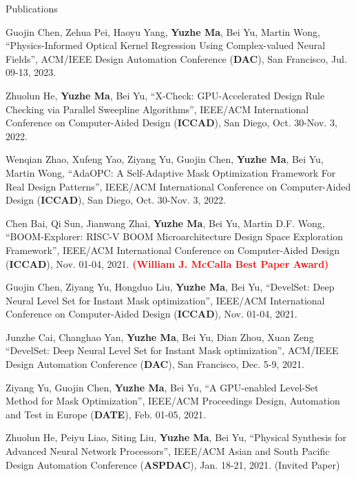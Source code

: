 \begin{rSection}{Publications}
\begin{etaremune}
\item {
    Guojin Chen, Zehua Pei, Haoyu Yang, \textbf{Yuzhe Ma}, Bei Yu, Martin Wong,
    ``Physics-Informed Optical Kernel Regression Using Complex-valued Neural Fields'',
    ACM/IEEE Design Automation Conference (\textbf{DAC}), San Francisco, Jul. 09-13, 2023.
}

\item {
    Zhuolun He, \textbf{Yuzhe Ma}, Bei Yu,
    ``X-Check: GPU-Accelerated Design Rule Checking via Parallel Sweepline Algorithms'',
    IEEE/ACM International Conference on Computer-Aided Design (\textbf{ICCAD}), San Diego, Oct. 30-Nov. 3, 2022.
}

\item {
    Wenqian Zhao, Xufeng Yao, Ziyang Yu, Guojin Chen, \textbf{Yuzhe Ma}, Bei Yu, Martin Wong,
    ``AdaOPC: A Self-Adaptive Mask Optimization Framework For Real Design Patterns'',
    IEEE/ACM International Conference on Computer-Aided Design (\textbf{ICCAD}), San Diego, Oct. 30-Nov. 3, 2022.
}

\item {
    Chen Bai, Qi Sun, Jianwang Zhai, \textbf{Yuzhe Ma}, Bei Yu, Martin D.F. Wong,
    ``BOOM-Explorer: RISC-V BOOM Microarchitecture Design Space Exploration Framework'',
    IEEE/ACM International Conference on Computer-Aided Design (\textbf{ICCAD}), Nov. 01-04, 2021.
    \textcolor{red}{\textbf{(William J. McCalla Best Paper Award)}}
}


\item {
    Guojin Chen, Ziyang Yu, Hongduo Liu, \textbf{Yuzhe Ma}, Bei Yu,
    ``DevelSet: Deep Neural Level Set for Instant Mask optimization'',
    IEEE/ACM International Conference on Computer-Aided Design (\textbf{ICCAD}), Nov. 01-04, 2021.
}

\item {
    Junzhe Cai, Changhao Yan, \textbf{Yuzhe Ma}, Bei Yu, Dian Zhou, Xuan Zeng
    ``DevelSet: Deep Neural Level Set for Instant Mask optimization'',
    ACM/IEEE Design Automation Conference (\textbf{DAC}), San Francisco, Dec. 5-9, 2021. 
}

\item {
        Ziyang Yu, Guojin Chen, \textbf{Yuzhe Ma}, Bei Yu,
        ``A GPU-enabled Level-Set Method for Mask Optimization'',
        IEEE/ACM Proceedings Design, Automation and Test in Europe (\textbf{DATE}), Feb. 01-05, 2021.
    }

\item {
        Zhuolun He, Peiyu Liao, Siting Liu, \textbf{Yuzhe Ma}, Bei Yu,
        ``Physical Synthesis for Advanced Neural Network Processors'',
         IEEE/ACM Asian and South Pacific Design Automation Conference (\textbf{ASPDAC}), Jan. 18-21, 2021. (Invited Paper)
    }


\end{etaremune}
\end{rSection}
